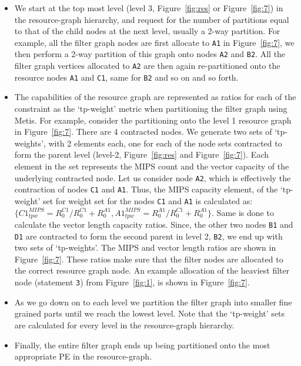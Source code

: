 \begin{itemize}

\item We start at the top most level (level 3, Figure~\ref{fig:res} or
  Figure~\ref{fig:7}) in the resource-graph hierarchy, and request for
  the number of partitions equal to that of the child nodes at the next
  level, usually a 2-way partition. For example, all the filter graph
  nodes are first allocate to \texttt{A1} in Figure~\ref{fig:7}, we then
  perform a 2-way partition of this graph onto nodes \texttt{A2} and
  \texttt{B2}. All the filter graph vertices allocated to \texttt{A2} are
  then again re-partitioned onto the resource nodes \texttt{A1} and
  \texttt{C1}, same for \texttt{B2} and so on and so forth.

\item The capabilities of the resource graph are represented as ratios
  for each of the constraint as the `tp-weight' metric when partitioning
  the filter graph using Metis. For example, consider the partitioning
  onto the level 1 resource graph in Figure~\ref{fig:7}. There are 4
  contracted nodes. We generate two sets of `tp-weights', with 2
  elements each, one for each of the node sets contracted to form the
  parent level (level-2, Figure~\ref{fig:res} and
  Figure~\ref{fig:7}). Each element in the set represents the MIPS count
  and the vector capacity of the underlying contracted node. Let us
  consider node \texttt{A2}, which is effectively the contraction of
  nodes \texttt{C1} and \texttt{A1}. Thus, the MIPS capacity element, of
  the `tp-weight' set for weight set for the nodes \texttt{C1} and
  \texttt{A1} is calculated as: {$\{C1^{MIPS}_{tpw} = R^{C1}_0/R^{C1}_0
    + R^{A1}_0, A1^{MIPS}_{tpw} = R^{A1}_0/R^{C1}_0 + R^{A1}_0\}$}. Same
  is done to calculate the vector length capacity ratios. Since, the
  other two nodes \texttt{B1} and \texttt{D1} are contracted to form the
  second parent in level 2, \texttt{B2}, we end up with two sets of
  `tp-weights'. The MIPS and vector length ratios are shown in
  Figure~\ref{fig:7}. These ratios make sure that the filter nodes are
  allocated to the correct resource graph node. An example allocation of
  the heaviest filter node (statement \texttt{3}) from Figure~\ref{fig:1},
  is shown in Figure~\ref{fig:7}.

\item As we go down on to each level we partition the filter graph into
  smaller fine grained parts until we reach the lowest level. Note that
  the `tp-weight' sets are calculated for every level in the
  resource-graph hierarchy.

\item Finally, the entire filter graph ends up being partitioned onto the
  most appropriate PE in the resource-graph.

\end{itemize}


